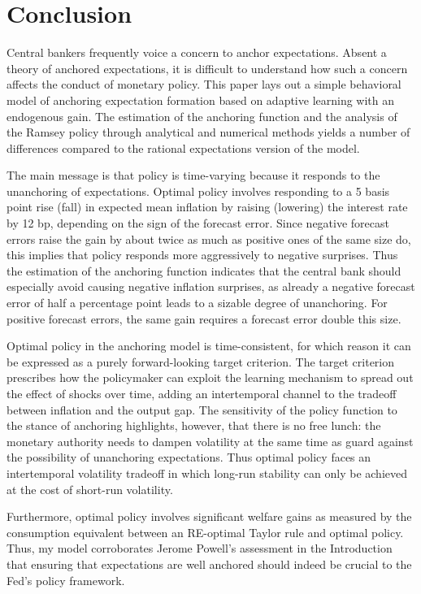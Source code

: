 \documentclass[11pt]{article}
\renewcommand{\[}{\begin{equation}}
\renewcommand{\]}{\end{equation}}
\def\movepibar{5 }
\def\movei{12 }
\begin{document}
\section{Conclusion}\label{conclusion}
Central bankers frequently voice a concern to anchor expectations. Absent a theory of anchored expectations, it is difficult to understand how such a concern affects the conduct of monetary policy. This paper lays out a simple behavioral model of anchoring expectation formation based on adaptive learning with an endogenous gain. The estimation of the anchoring function and the analysis of the Ramsey policy through analytical and numerical methods yields a number of differences compared to the rational expectations version of the model. 

The main message is that policy is time-varying because it responds to the unanchoring of expectations. Optimal policy involves responding to a \movepibar basis point rise (fall) in expected mean inflation by raising (lowering) the interest rate by \movei bp, depending on the sign of the forecast error. Since negative forecast errors raise the gain by about twice as much as positive ones of the same size do, this implies that policy responds more aggressively to negative surprises. Thus the estimation of the anchoring function indicates that the central bank should especially avoid causing negative inflation surprises, as already a negative forecast error of half a percentage point leads to a sizable degree of unanchoring. For positive forecast errors, the same gain requires a forecast error double this size. 

Optimal policy in the anchoring model is time-consistent, for which reason it can be expressed as a purely forward-looking target criterion. The target criterion prescribes how the policymaker can exploit the learning mechanism to spread out the effect of shocks over time, adding an intertemporal channel to the tradeoff between inflation and the output gap. The sensitivity of the policy function to the stance of anchoring highlights, however, that there is no free lunch: the monetary authority needs to dampen volatility at the same time as guard against the possibility of unanchoring expectations. Thus optimal policy faces an intertemporal volatility tradeoff in which long-run stability can only be achieved at the cost of short-run volatility.

Furthermore, 
optimal policy involves significant welfare gains as measured by the consumption equivalent between an RE-optimal Taylor rule and optimal policy.
Thus, my model corroborates Jerome Powell's assessment in the Introduction that ensuring that expectations are well anchored should indeed be crucial to the Fed's policy framework.
\end{document}
